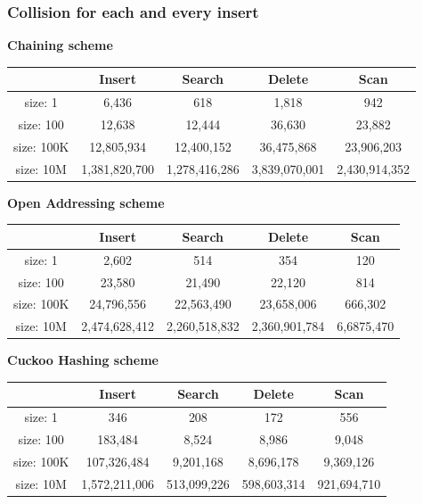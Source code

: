 \documentclass{article} %
\begin{document}
    \subsubsection*{Collision for each and every insert}
    \textbf{Chaining scheme}
    \begin{center}
        \begin{tabular}{|c|c|c|c|c|}\hline
        & Insert & Search & Delete & Scan\\\hline
        size: 1 & 6,436 & 618 & 1,818 & 942\\\hline
        size: 100 & 12,638 & 12,444 & 36,630 & 23,882\\\hline
        size: 100K & 12,805,934 & 12,400,152 & 36,475,868 & 23,906,203\\\hline
        size: 10M & 1,381,820,700 & 1,278,416,286 & 3,839,070,001 & 2,430,914,352\\\hline
        \end{tabular}
    \end{center}

    \textbf{Open Addressing scheme}
    \begin{center}
        \begin{tabular}{|c|c|c|c|c|}\hline
        & Insert & Search & Delete & Scan\\\hline
        size: 1 & 2,602 & 514 & 354 & 120\\\hline
        size: 100 & 23,580 & 21,490 & 22,120 & 814\\\hline
        size: 100K & 24,796,556 & 22,563,490 & 23,658,006 & 666,302\\\hline
        size: 10M & 2,474,628,412 & 2,260,518,832 & 2,360,901,784 & 6,6875,470\\\hline
        \end{tabular}
    \end{center}


    \textbf{Cuckoo Hashing scheme}
    \begin{center}
        \begin{tabular}{|c|c|c|c|c|}\hline
        & Insert & Search & Delete & Scan\\\hline
        size: 1 & 346 & 208 & 172 & 556\\\hline
        size: 100 & 183,484 & 8,524 & 8,986 & 9,048\\\hline
        size: 100K & 107,326,484 & 9,201,168 & 8,696,178 & 9,369,126\\\hline
        size: 10M & 1,572,211,006 & 513,099,226 & 598,603,314 & 921,694,710\\\hline
        \end{tabular}
    \end{center}
\end{document}

